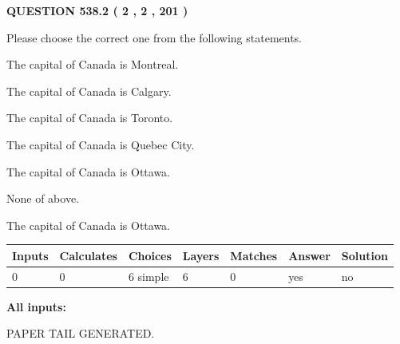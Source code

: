 \documentclass[12pt]{article}
\begin{document}
\vspace{0.2in}
  
{\textbf{\Large{QUESTION
538.2 
 ( 2 , 2 , 201 )
}}}
  
  
Please choose the correct one from the following statements.
 
 
The capital of Canada is Montreal.
 
 
The capital of Canada is Calgary.
 
 
The capital of Canada is Toronto.
 
 
The capital of Canada is Quebec City.
 
 
The capital of Canada is Ottawa.
 
 
 None of above.
 
 
\noindent{}
 
 
The capital of Canada is Ottawa.
 
 
\noindent{}
 
 
   
   
   
   
\noindent\begin{tabular}{|l|l|l|l|l|l|l|}
 \hline
Inputs & Calculates & Choices & Layers & Matches & Answer & Solution \\ \hline
 0  & 
 0  & 
 6
  simple  
  & 
 6  & 
 0  & 
  yes & 
  no 
  \\ \hline
 \end{tabular}
   
   
   
   
\noindent{}
   
   
   
   
\noindent\vspace{0.1in}\hspace{-0.08in} {\textbf{\Large{All inputs: }}}
   
   
   
   
   
   
 \vspace{0.2in}
 
   
   
\vspace{2.0in} PAPER TAIL GENERATED.
   
\end{document}
